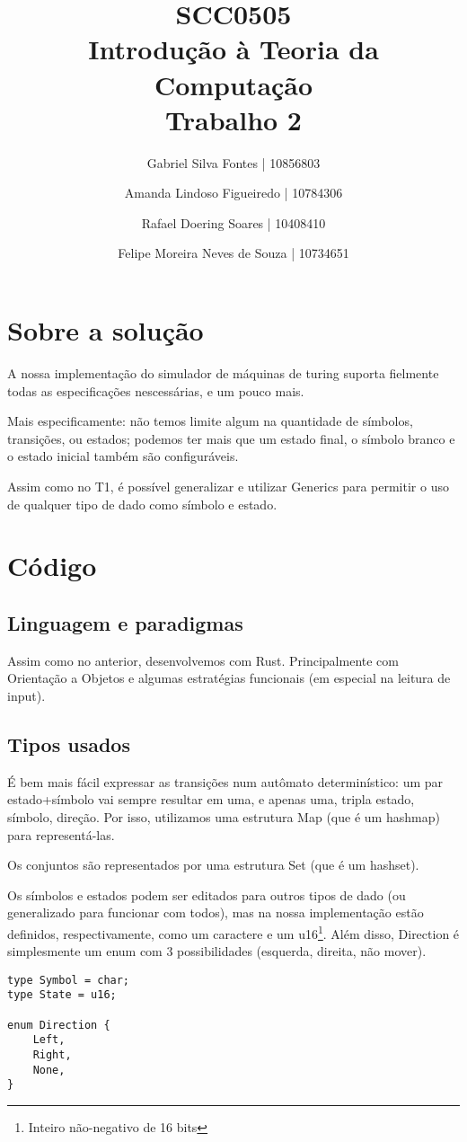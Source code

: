 \documentclass[12pt]{article}
\title{SCC0505 \\ Introdução à Teoria da Computação \\ Trabalho 2}
\author{Gabriel Silva Fontes | 10856803
        \and
        Amanda Lindoso Figueiredo | 10784306
        \and
        Rafael Doering Soares | 10408410
        \and
        Felipe Moreira Neves de Souza | 10734651}
\begin{document}
\maketitle
\section{Sobre a solução}
A nossa implementação do simulador de máquinas de turing suporta fielmente todas as especificações nescessárias, e um pouco mais.

Mais especificamente: não temos limite algum na quantidade de símbolos, transições, ou estados; podemos ter mais que um estado final, o símbolo branco e o estado inicial também são configuráveis.

Assim como no T1, é possível generalizar e utilizar Generics para permitir o uso de qualquer tipo de dado como símbolo e estado.

\section{Código}
\subsection{Linguagem e paradigmas}
Assim como no anterior, desenvolvemos com Rust. Principalmente com Orientação a Objetos e algumas estratégias funcionais (em especial na leitura de input).


\subsection{Tipos usados}
É bem mais fácil expressar as transições num autômato determinístico: um par estado+símbolo vai sempre resultar em uma, e apenas uma, tripla estado, símbolo, direção. Por isso, utilizamos uma estrutura Map (que é um hashmap) para representá-las.

Os conjuntos são representados por uma estrutura Set (que é um hashset).

Os símbolos e estados podem ser editados para outros tipos de dado (ou generalizado para funcionar com todos), mas na nossa implementação estão definidos, respectivamente, como um caractere e um u16\footnote{Inteiro não-negativo de 16 bits}. Além disso, Direction é simplesmente um enum com 3 possibilidades (esquerda, direita, não mover).

\begin{verbatim}
type Symbol = char;
type State = u16;

enum Direction {
    Left,
    Right,
    None,
}
\end{verbatim}
\end{document}
